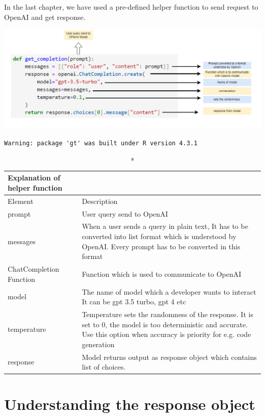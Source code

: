 \documentclass[
  letterpaper,
  DIV=11,
  numbers=noendperiod]{scrreprt}
\begin{document}
In the last chapter, we have used a pre-defined helper function to send
request to OpenAI and get response.

\includegraphics{1_open_ai_helper_function.drawio.png}

\begin{verbatim}
Warning: package 'gt' was built under R version 4.3.1
\end{verbatim}

\begin{longtable*}{ll}
\caption*{
{\large \textbf{Explanation of helper function}}
} \\ 
\toprule
Element & Description \\ 
\midrule\addlinespace[2.5pt]
prompt & User query send to OpenAI \\ 
messages & When a user sends a query in plain text,  It has to be converted into list format which is understood by OpenAI. Every prompt has to be converted in this format \\ 
ChatCompletion Function & Function which is used to communicate to OpenAI \\ 
model & The name of model which a developer wants to interact It can be gpt 3.5 turbo, gpt 4 etc \\ 
temperature & Temperature sets the randomness of the response. It is set to 0, the model is too deterministic and accurate. Use this option when accuracy is priority for e.g. code generation \\ 
response & Model returns output as response object which  contains list of choices. \\ 
\bottomrule
\end{longtable*}

\hypertarget{understanding-the-response-object}{%
\section{Understanding the response
object}\label{understanding-the-response-object}}
\end{document}
